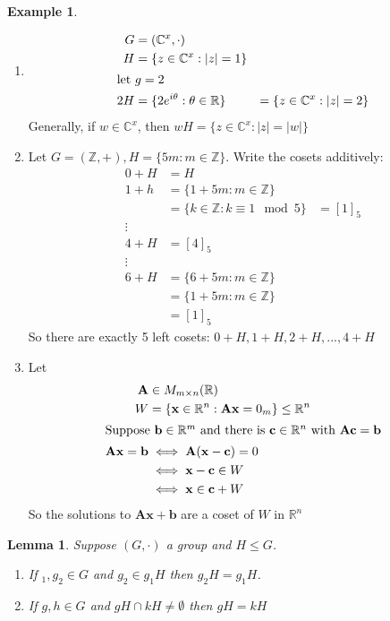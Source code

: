\documentclass{report}
\newtheorem{lemma}[theorem]{Lemma}
\theoremstyle{remark}
\theoremstyle{definition}
\theoremstyle{definition}
\newtheorem{example}[theorem]{Example}
\theoremstyle{theorem}
\renewcommand{\v}[1]{\mathbf{#1}}
\begin{document}
\begin{example}
\begin{enumerate}[label=\textcircled{\tiny{\arabic*}}]
    \item \begin{align*}
        G&=(\mathbb{C}^x, \cdot)\\
        H&=\{z \in \mathbb{C}^x: |z|=1\}\\
        \intertext{let $g=2$}
        2H&=\{2e^{i\theta}:\theta \in \mathbb{R}\}
        &=\{z \in \mathbb{C}^x:|z|=2\}
    \end{align*}
    Generally, if $w \in \mathbb{C}^x$, then $wH=\{z \in \mathbb{C}^x:|z| = |w|\}$
    \item Let $G=(\mathbb{Z}, +), H=\{5m: m \in \mathbb{Z}\}$. Write the cosets additively:
    \begin{align*}
        0+H&=H\\
        1+h&=\{1+5m:m \in \mathbb{Z}\}\\
        &= \{k \in \mathbb{Z}:k \equiv 1 \mod 5\}
        &=[1]_5\\
        \vdots&\\
        4+H&=[4]_5\\
        \vdots&\\
        6+H&=\{6+5m:m \in \mathbb{Z}\}\\
        &=\{1+5m:m \in \mathbb{Z}\}\\
        &=[1]_5
    \end{align*}
    So there are exactly 5 left cosets: $0+H, 1+H, 2+H,..., 4+H$
    \item Let
    \begin{align*}
        \v{A} &\in M_{m \times n}(\mathbb{R})\\
        W &= \{\v{x} \in \mathbb{R}^n: \v{Ax}=0_m\} \leq \mathbb{R}^n\\
        \intertext{Suppose $\v{b} \in \mathbb{R}^m$ and there is $\v{c} \in \mathbb{R}^n$ with $\v{Ac}=\v{b}$}
        \v{Ax}=\v{b} &\iff \v{A}(\v{x}-\v{c})=0\\
        &\iff \v{x}-\v{c} \in W\\
        &\iff \v{x} \in \v{c}+W
    \end{align*}
    So the solutions to $\v{Ax}+\v{b}$ are a coset of $W$ in $\mathbb{R}^n$
\end{enumerate}
\end{example}
\begin{lemma}
Suppose $(G,\cdot)$ a group and $H \leq G$.
\begin{enumerate}[label=\textcircled{\tiny{\arabic*}}]
    \item If $_1, g_2 \in G$ and $g_2 \in g_1H$ then $g_2H=g_1H$.
    \item If $g, h \in G$ and $gH \cap kH \neq \emptyset$ then $gH=kH$
\end{enumerate}
\end{lemma}
\end{document}
